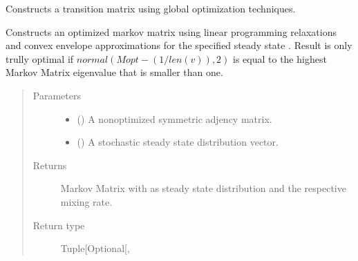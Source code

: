 \documentclass[letterpaper,10pt,english]{sphinxmanual}
\begin{document}
\begin{fulllineitems}
\label{\detokenize{app.domain.helpers:app.domain.helpers.matrices.new_go_transition_matrix}}
Constructs a transition matrix using global optimization techniques.

Constructs an optimized markov matrix using linear programming relaxations
and convex envelope approximations for the specified steady state .
Result is only trully optimal if \(normal(Mopt - (1 / len(v)), 2)\)
is equal to the highest Markov Matrix eigenvalue that is smaller than one.
\begin{quote}\begin{description}
\item[{Parameters}] \leavevmode\begin{itemize}
\item {} 
 () \textendash{} A non\sphinxhyphen{}optimized symmetric adjency matrix.

\item {} 
 () \textendash{} A stochastic steady state distribution vector.

\end{itemize}

\item[{Returns}] \leavevmode
Markov Matrix with  as steady state distribution and the
respective mixing rate.

\item[{Return type}] \leavevmode
Tuple{[}Optional{[}\sphinxhref{https://numpy.org/doc/stable/reference/generated/numpy.ndarray.html\#numpy.ndarray}{numpy.ndarray}{]}, \sphinxhref{https://docs.python.org/3.7/library/functions.html\#float}{float}{]}

\end{description}\end{quote}

\end{fulllineitems}

\end{document}
